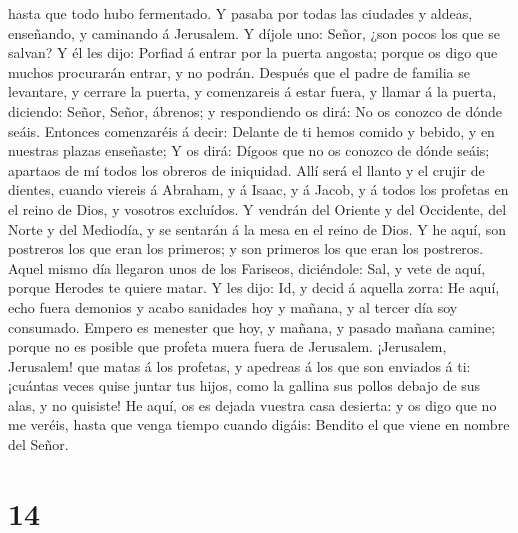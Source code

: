hasta que todo hubo fermentado.  Y pasaba por todas las
ciudades y aldeas, enseñando, y caminando á Jerusalem.  Y
díjole uno: Señor, ¿son pocos los que se salvan? Y él les dijo:
 Porfiad á entrar por la puerta angosta; porque os digo que
muchos procurarán entrar, y no podrán.  Después que el
padre de familia se levantare, y cerrare la puerta, y comenzareis á
estar fuera, y llamar á la puerta, diciendo: Señor, Señor, ábrenos; y
respondiendo os dirá: No os conozco de dónde seáis. 
Entonces comenzaréis á decir: Delante de ti hemos comido y bebido, y en
nuestras plazas enseñaste;  Y os dirá: Dígoos que no os
conozco de dónde seáis; apartaos de mí todos los obreros de iniquidad.
 Allí será el llanto y el crujir de dientes, cuando viereis
á Abraham, y á Isaac, y á Jacob, y á todos los profetas en el reino de
Dios, y vosotros excluídos.  Y vendrán del Oriente y del
Occidente, del Norte y del Mediodía, y se sentarán á la mesa en el reino
de Dios.  Y he aquí, son postreros los que eran los
primeros; y son primeros los que eran los postreros.  Aquel
mismo día llegaron unos de los Fariseos, diciéndole: Sal, y vete de
aquí, porque Herodes te quiere matar.  Y les dijo: Id, y
decid á aquella zorra: He aquí, echo fuera demonios y acabo sanidades
hoy y mañana, y al tercer día soy consumado.  Empero es
menester que hoy, y mañana, y pasado mañana camine; porque no es posible
que profeta muera fuera de Jerusalem.  ¡Jerusalem,
Jerusalem! que matas á los profetas, y apedreas á los que son enviados á
ti: ¡cuántas veces quise juntar tus hijos, como la gallina sus pollos
debajo de sus alas, y no quisiste!  He aquí, os es dejada
vuestra casa desierta: y os digo que no me veréis, hasta que venga
tiempo cuando digáis: Bendito el que viene en nombre del Señor.

\hypertarget{section-13}{%
\section{14}\label{section-13}}

